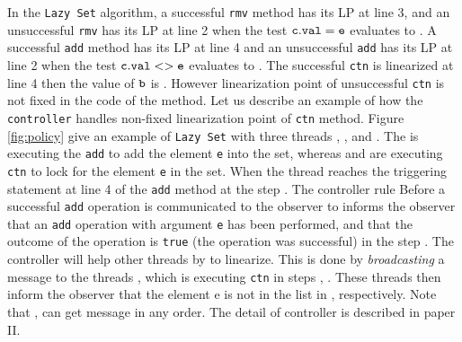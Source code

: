 In the {\tt Lazy Set} algorithm, a successful {\tt rmv} method has its LP at line 3, and an unsuccessful {\tt rmv} has its LP at line 2 when the test $\tt c.val = e$ evaluates to \false. A successful {\tt add} method has its LP at line 4 and an unsuccessful {\tt add} has its LP at line 2 when the test $\tt c.val <> e$ evaluates to \false\;. The successful {\tt ctn} is linearized at line 4 then the value of $\tt b$ is \true. However linearization point of unsuccessful {\tt ctn} is not fixed in the code of the method.  Let us describe an example of how the {\tt controller} handles non-fixed linearization point of {\tt ctn} method. Figure \ref{fig:policy} give an example of {\tt Lazy Set} with three threads \threada\;, \threadb\;, and \threadc. The \threada \; is executing the {\tt add} to add the element {\tt e} into the set, whereas \threadb\; and \threadc\; are executing {\tt ctn} to lock for the element {\tt e} in the set. When the thread \threada\; reaches the triggering statement at line 4 of the {\tt add} method at the step \;\stepa\;. The controller rule 
Before a successful {\tt add} operation is communicated to the observer 
to informs the observer that an {\tt add} operation 
with argument {\tt e} has been performed, and that the outcome
of the operation is {\tt true} (the operation was successful) in the step \stepf\;. The controller will help other threads
by to linearize. This is done by {\it broadcasting} a message to the threads \threadb, \threadc\; which is executing {\tt ctn} in steps \stepb, \stepc. These threads then inform the observer that the element e is not in the list in \stepc, \stepe\; respectively. Note that \threadb, \threadc\; can get message in any order. The detail of controller is described in paper II.


